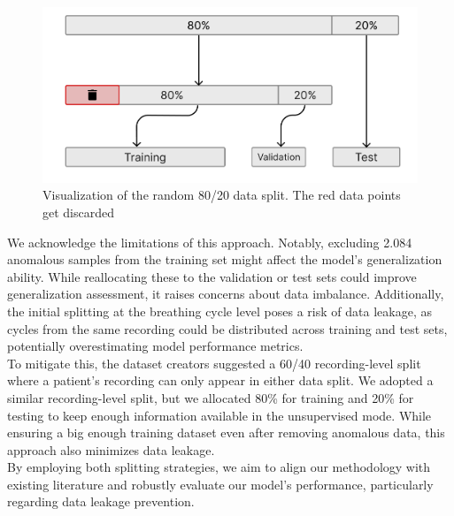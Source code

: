 \begin{figure}[h!]
    \includegraphics[width=\linewidth]{images/split}
    \caption{
    Visualization of the random 80/20 data split. The red data points get discarded
}
\end{figure}

We acknowledge the limitations of this approach. Notably, excluding 2.084 anomalous samples from the training set might affect the model's generalization ability. While reallocating these to the validation or test sets could improve generalization assessment, it raises concerns about data imbalance. Additionally, the initial splitting at the breathing cycle level poses a risk of data leakage, as cycles from the same recording could be distributed across training and test sets, potentially overestimating model performance metrics.\\
To mitigate this, the dataset creators suggested a 60/40 recording-level split where a patient's recording can only appear in either data split. We adopted a similar recording-level split, but we allocated 80\% for training and 20\% for testing to keep enough information available in the unsupervised mode. While ensuring a big enough training dataset even after removing anomalous data, this approach also minimizes data leakage.\\
By employing both splitting strategies, we aim to align our methodology with existing literature and robustly evaluate our model's performance, particularly regarding data leakage prevention.

